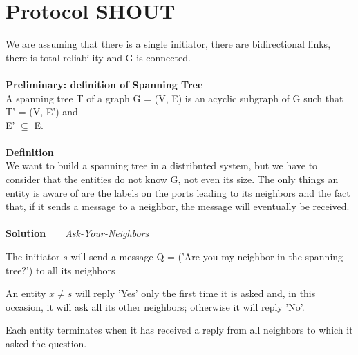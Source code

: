 \documentclass[paper=a4, fontsize=11pt]{scrartcl} %
\numberwithin{equation}{section} %
\numberwithin{figure}{section} %
\numberwithin{table}{section} %
\begin{document}
\section*{Protocol SHOUT}
We are assuming that there is a single initiator, there are bidirectional links, there is total reliability and G is connected. \\ \\
\textbf{Preliminary: definition of Spanning Tree} \\ 
A spanning tree T of a graph G = (V, E) is an acyclic subgraph of G such that T' = (V, E') and\\ E' $\subseteq$ E.
\\ ~ \\
\textbf{Definition} \\
We want to build a spanning tree in a distributed system, but we have to consider that the entities do not know G, not even its size. The only things an entity is aware of are the labels on the ports leading to its neighbors and the fact that, if it sends a message to a neighbor, the message will eventually be received.\\~\\
\textbf{Solution} ~ ~ \textit{Ask-Your-Neighbors}
\begin{compactitem}
\item The initiator $s$ will send a message Q = ('Are you my neighbor in the spanning tree?') to all its neighbors
\item An entity $x \neq s$ will reply 'Yes' only the first time it is asked and, in this occasion, it will ask all its other neighbors; otherwise it will reply 'No'.
\item Each entity terminates when it has received a reply from all neighbors to which it asked the question.
\end{compactitem}
\end{document}
